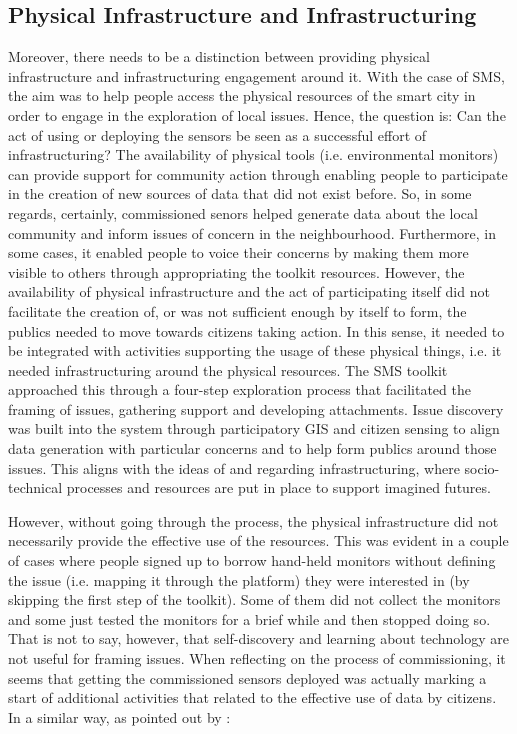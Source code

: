 \subsection{Physical Infrastructure and Infrastructuring}
Moreover, there needs to be a distinction between providing physical infrastructure and infrastructuring engagement around it. With the case of SMS, the aim was to help people access the physical resources of the smart city in order to engage in the exploration of local issues. Hence, the question is: Can the act of using or deploying the sensors be seen as a successful effort of infrastructuring? The availability of physical tools (i.e. environmental monitors) can provide support for community action through enabling people to participate in the creation of new sources of data that did not exist before. So, in some regards, certainly, commissioned senors helped generate data about the local community and inform issues of concern in the neighbourhood. Furthermore, in some cases, it enabled people to voice their concerns by making them more visible to others through appropriating the toolkit resources. However, the availability of physical infrastructure and the act of participating itself did not facilitate the creation of, or was not sufficient enough by itself to form, the publics \citep{dewey_public_1954} needed to move towards citizens taking action. In this sense, it needed to be integrated with activities supporting the usage of these physical things, i.e. it needed infrastructuring around the physical resources. The SMS toolkit approached this through a four-step exploration process that facilitated the framing of issues, gathering support and developing attachments. Issue discovery was built into the system through participatory GIS and citizen sensing to align data generation with particular concerns and to help form publics around those issues. This aligns with the ideas of \citet{marres_issues_2007} and \citet{dantec_infrastructuring_2013} regarding infrastructuring, where socio-technical processes and resources are put in place to support imagined futures.

However, without going through the process, the physical infrastructure did not necessarily provide the effective use of the resources. This was evident in a couple of cases where people signed up to borrow hand-held monitors without defining the issue (i.e. mapping it through the platform) they were interested in (by skipping the first step of the toolkit). Some of them did not collect the monitors and some just tested the monitors for a brief while and then stopped doing so. That is not to say, however, that self-discovery and learning about technology are not useful for framing issues. When reflecting on the process of commissioning, it seems that getting the commissioned sensors deployed was actually marking a start of additional activities that related to the effective use of data by citizens. In a similar way, as pointed out by \cite{dantec_infrastructuring_2013}:

